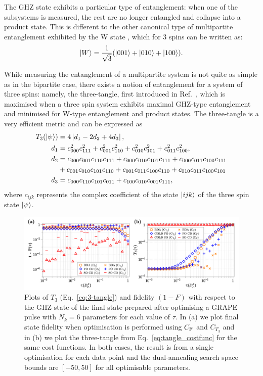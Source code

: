 The GHZ state exhibits a particular type of entanglement: when one of the subsystems is measured, the rest are no longer entangled and collapse into a product state. This is different to the other canonical type of multipartite entanglement exhibited by the W state \cite{cabello_bells_2002}, which for 3 spins can be written as:
\begin{equation}\label{eq:W_state}
    \ket{W} = \frac{1}{\sqrt{3}}(\ket{001} + \ket{010} + \ket{100}).
\end{equation}

While measuring the entanglement of a multipartite system is not quite as simple as in the bipartite case, there exists a notion of entanglement for a system of three spins: namely, the three-tangle, first introduced in Ref.~\cite{coffman_distributed_2000}, which is maximised when a three spin system exhibits maximal GHZ-type entanglement and minimised for W-type entanglement and product states. The three-tangle is a very efficient metric and can be expressed as
\begin{equation}\label{eq:3-tangle}
	\begin{aligned}
		T_3(\ket{\psi}) &= 4 \left| d_1 - 2 d_2 + 4 d_3 \right|, \\
		d_1 &= c^2_{000}c^2_{111} + c^2_{001}c^2_{110} + c^2_{010}c^2_{101} + c^2_{011}c^2_{100}, \\
		d_2 &= c_{000}c_{001}c_{110}c_{111} + c_{000}c_{010}c_{101}c_{111} + c_{000}c_{011}c_{100}c_{111} \\
		 &+ c_{001}c_{010}c_{101}c_{110} + c_{001}c_{011}c_{100}c_{110} + c_{010}c_{011}c_{100}c_{101} \\
		d_3 &= c_{000}c_{110}c_{101}c_{011} + c_{100}c_{010}c_{001}c_{111},
	\end{aligned}
\end{equation}
where $c_{ijk}$ represents the complex coefficient of the state $\ket{ijk}$ of the three spin state $\ket{\psi}$. 

\begin{figure}[t]
    \centering
    \includegraphics[width=\linewidth]{images/tangle_plots.png} \caption[Preparing 3-spin GHZ states using the 3-tangle as a metric.]{Plots of $T_3$ (Eq.~\eqref{eq:3-tangle}) and fidelity $(1 - F)$ with respect to the GHZ state of the final state prepared after optimising a GRAPE pulse with $N_k = 6$ parameters for each value of $\tau$. In (a) we plot final state fidelity when optimisation is performed using $C_{\rm F}$ and $C_{T_3}$ and in (b) we plot the three-tangle from Eq.~\eqref{eq:tangle_costfunc} for the same cost functions. In both cases, the result is from a single optimisation for each data point and the dual-annealing search space bounds are $[-50,50]$ for all optimisable parameters.}\label{fig:tangle_v_fidelity}
\end{figure}

